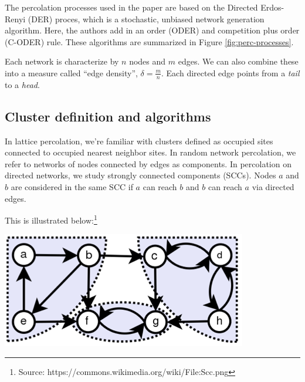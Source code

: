 \documentclass[11pt, oneside]{article}   	%
\begin{document}
The percolation processes used in the paper are based on the Directed Erdos-Renyi (DER) proces, which is a stochastic, unbiased network generation algorithm. Here, the authors add in an order (ODER) and competition plus order (C-ODER) rule. These algorithms are summarized in Figure \ref{fig:perc-processes}.

Each network is characterize by $n$ nodes and $m$ edges. We can also combine these into a measure called ``edge density'', $\delta=\frac{m}{n}$. Each directed edge points from a \textit{tail} to a \textit{head}.

\subsection{Cluster definition and algorithms}
In lattice percolation, we're familiar with clusters defined as occupied sites connected to occupied nearest neighbor sites. In random network percolation, we refer to networks of nodes connected by edges as components. In percolation on directed networks, we study strongly connected components (SCCs). Nodes $a$ and $b$ are considered in the same SCC if $a$ can reach $b$ and $b$ can reach $a$ via directed edges.

This is illustrated below:\footnote{Source: https://commons.wikimedia.org/wiki/File:Scc.png} \\
\begin{center}
\includegraphics[scale = 0.5]{figs/SCC.png}
\end{center}
\end{document}
